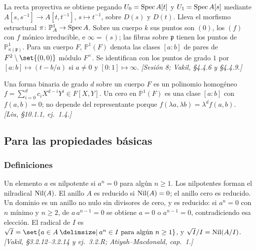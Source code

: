 \begin{defi}
\label{defi:s09-recta-proyectiva}
La recta proyectiva se obtiene pegando $U_0=\operatorname{Spec} A[t]$ y $U_1=\operatorname{Spec} A[s]$ mediante $A[s,s^{-1}]\to A[t,t^{-1}]$, $s\mapsto t^{-1}$, sobre $D(s)$ y $D(t)$. Lleva el morfismo estructural $\pi\colon \mathbb P^1_A\to\operatorname{Spec} A$. Sobre un cuerpo $k$ sus puntos son $(0)$, los $(f)$ con $f$ mónico irreducible, e $\infty=(s)$; las fibras sobre $\mathfrak p$ tienen los puntos de $\mathbb P^1_{\kappa(\mathfrak p)}$. Para un cuerpo $F$, $\mathbb P^1(F)$ denota las clases $[a:b]$ de pares de $F^2\setminus\set{(0,0)}$ módulo $F^\times$. Se identifican con los puntos de grado $1$ por $[a:b]\mapsto(t-b/a)$ si $a\ne0$ y $[0:1]\mapsto\infty$. \emph{[Sesión 8; Vakil, \S4.4.6 y \S4.4.9.]}
\end{defi}

\begin{defi}
\label{defi:s09-formas-binarias}
Una forma binaria de grado $d$ sobre un cuerpo $F$ es un polinomio homogéneo $f=\sum_{i=0}^d c_iX^{d-i}Y^i\in F[X,Y]$. Un cero en $\mathbb P^1(F)$ es una clase $[a:b]$ con $f(a,b)=0$; no depende del representante porque $f(\lambda a,\lambda b)=\lambda^df(a,b)$. \emph{[Liu, \S10.1.1, ej.~1.4.]}
\end{defi}

\subsection{Para las propiedades básicas}
\subsubsection{Definiciones}

\begin{defi}
\label{defi:s09-nilpotentes}
Un elemento $a$ es nilpotente si $a^n=0$ para algún $n\ge1$. Los nilpotentes forman el nilradical $\operatorname{Nil}(A)$. El anillo $A$ es reducido si $\operatorname{Nil}(A)=0$; el anillo cero es reducido. Un dominio es un anillo no nulo sin divisores de cero, y es reducido: si $a^n=0$ con $n$ mínimo y $n\ge2$, de $a\,a^{n-1}=0$ se obtiene $a=0$ o $a^{n-1}=0$, contradiciendo esa elección. El radical de $I$ es $\sqrt I=\set{a\in A\given a^n\in I\text{ para algún }n\ge1}$, y $\sqrt I/I=\operatorname{Nil}(A/I)$. \emph{[Vakil, \S3.2.12--3.2.14 y ej.~3.2.R; Atiyah--Macdonald, cap.~1.]}
\end{defi}

